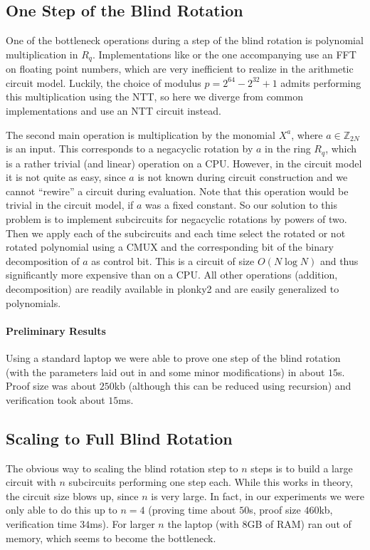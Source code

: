 \documentclass[9pt]{extarticle}
\newcommand{\ints}{\mathds{Z}}
\begin{document}
\subsection{One Step of the Blind Rotation}
\label{sec:step}

One of the bottleneck operations during a step of the blind rotation is polynomial multiplication in $R_q$. Implementations like \cite{TFHE-rs} or the one accompanying \cite{AC:CGGI16} use an FFT on floating point numbers, which are very inefficient to realize in the arithmetic circuit model. Luckily, the choice of modulus $p = 2^{64} - 2^{32} + 1$ admits performing this multiplication using the NTT, so here we diverge from common implementations and use an NTT circuit instead.

The second main operation is multiplication by the monomial $X^a$, where $a \in \ints_{2N}$ is an input. This corresponds to a negacyclic rotation by $a$ in the ring $R_q$, which is a rather trivial (and linear) operation on a CPU. However, in the circuit model it is not quite as easy, since $a$ is not known during circuit construction and we cannot ``rewire'' a circuit during evaluation. Note that this operation would be trivial in the circuit model, if $a$ was a fixed constant. So our solution to this problem is to implement subcircuits for negacyclic rotations by powers of two. Then we apply each of the subcircuits and each time select the rotated or not rotated polynomial using a CMUX and the corresponding bit of the binary decomposition of $a$ as control bit. This is a circuit of size $O(N \log N)$ and thus significantly more expensive than on a CPU. All other operations (addition, decomposition) are readily available in plonky2 and are easily generalized to polynomials.

\paragraph{Preliminary Results}
Using a standard laptop we were able to prove one step of the blind rotation (with the parameters laid out in  and some minor modifications) in about $15$s. Proof size was about $250$kb (although this can be reduced using recursion) and verification took about $15$ms. 

\subsection{Scaling to Full Blind Rotation}
\label{sec:full}
The obvious way to scaling the blind rotation step to $n$ steps is to build a large circuit with $n$ subcircuits performing one step each. While this works in theory, the circuit size blows up, since $n$ is very large. In fact, in our experiments we were only able to do this up to $n = 4$ (proving time about $50$s, proof size $460$kb, verification time $34$ms). For larger $n$ the laptop (with $8$GB of RAM) ran out of memory, which seems to become the bottleneck.
\end{document}

